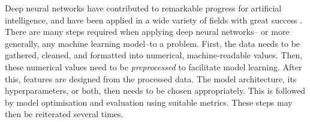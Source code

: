\documentclass{statsmsc}
\begin{document}
{%





Deep neural networks have contributed to remarkable progress
for artificial intelligence, and have been applied in a wide
variety of fields with great success \citep{dnn_survey}.
There are many steps required when applying deep neural networks--%
or more generally, any machine learning model--to a problem. First, 
the data needs to be gathered, cleaned, and formatted into numerical,
machine-readable values. Then, these numerical values need to be
\textit{preprocessed} to facilitate model learning.
After this, features are designed from the processed data.
The model architecture, its hyperparameters, or both, then needs to be
chosen appropriately. This is followed by model optimisation and
evaluation using suitable metrics. These steps may then be reiterated
several times.

}
\end{document}

